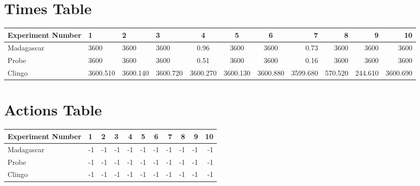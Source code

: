 \documentclass[8pt]{article}
\begin{document}
\begin{landscape}
\section{Times Table}\begin{tabular}{ | l | l | l | l | c | c | c | r | r | r | r | }\hline
Experiment Number & 1 & 2 & 3 & 4 & 5 & 6 & 7 & 8 & 9 & 10\\  \hline
Madagascar & 3600 & 3600 & 3600 & 0.96 & 3600 & 3600 & 0.73 & 3600 & 3600 & 3600\\  \hline
Probe & 3600 & 3600 & 3600 & 0.51 & 3600 & 3600 & 0.16 & 3600 & 3600 & 3600\\  \hline
Clingo & 3600.510 & 3600.140 & 3600.720 & 3600.270 & 3600.130 & 3600.880 & 3599.680 & 570.520 & 244.610 & 3600.690\\ \hline
\end{tabular}
\section{Actions Table}\begin{tabular}{ | l | l | l | l | c | c | c | r | r | r | r | }\hline
Experiment Number & 1 & 2 & 3 & 4 & 5 & 6 & 7 & 8 & 9 & 10\\ \hline
 Madagascar & -1 & -1 & -1 & -1 & -1 & -1 & -1 & -1 & -1 & -1\\ \hline
 Probe & -1 & -1 & -1 & -1 & -1 & -1 & -1 & -1 & -1 & -1\\ \hline
 Clingo & -1 & -1 & -1 & -1 & -1 & -1 & -1 & -1 & -1 & -1\\ \hline
\end{tabular}
\end{landscape}
\end{document}
